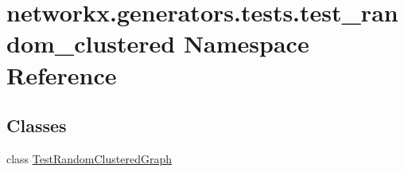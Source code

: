 \hypertarget{namespacenetworkx_1_1generators_1_1tests_1_1test__random__clustered}{}\section{networkx.\+generators.\+tests.\+test\+\_\+random\+\_\+clustered Namespace Reference}
\label{namespacenetworkx_1_1generators_1_1tests_1_1test__random__clustered}
\subsection*{Classes}
\begin{DoxyCompactItemize}
\item 
class \hyperlink{classnetworkx_1_1generators_1_1tests_1_1test__random__clustered_1_1TestRandomClusteredGraph}{Test\+Random\+Clustered\+Graph}
\end{DoxyCompactItemize}
